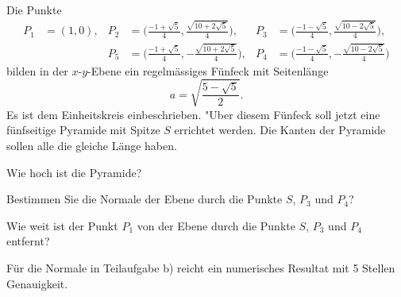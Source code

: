 Die Punkte
\begin{align*}
P_1&=(1,0),
&P_2&=\biggl(\frac{-1+\sqrt{5}}4, \frac{\sqrt{10+2\sqrt{5}}}4 \biggr),
&P_3&=\biggl(\frac{-1-\sqrt{5}}4, \frac{\sqrt{10-2\sqrt{5}}}4 \biggr),\\
&&P_5&=\biggl(\frac{-1+\sqrt{5}}4,-\frac{\sqrt{10+2\sqrt{5}}}4 \biggr),
&P_4&=\biggl(\frac{-1-\sqrt{5}}4,-\frac{\sqrt{10-2\sqrt{5}}}4 \biggr)
\end{align*}
bilden in der $x$-$y$-Ebene ein regelmässiges Fünfeck mit Seitenlänge
\[
a=\sqrt{\frac{5-\sqrt{5}}2}.
\]
Es ist dem Einheitskreis einbeschrieben.
"Uber diesem Fünfeck  soll jetzt eine fünfseitige Pyramide mit
Spitze $S$ errichtet werden.
Die Kanten der Pyramide sollen alle die gleiche Länge haben.
\begin{teilaufgaben}
\item
Wie hoch ist die Pyramide?
\item
Bestimmen Sie die Normale der Ebene durch die Punkte
$S$, $P_3$ und $P_4$?
\item
Wie weit ist der Punkt $P_1$ von der Ebene durch die Punkte
$S$, $P_3$ und $P_4$ entfernt?
\end{teilaufgaben}


\begin{hinweis}
Für die Normale in Teilaufgabe b) reicht ein numerisches Resultat
mit 5 Stellen Genauigkeit.
\end{hinweis}


